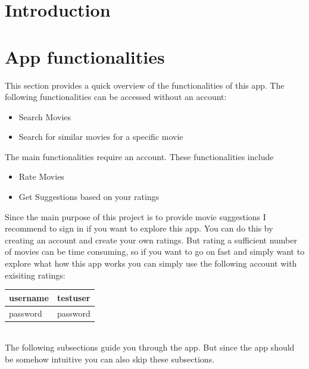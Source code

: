 \documentclass{article}
\begin{document}
\begin{abstract}
\end{abstract}

\tableofcontents

\newpage


\section{Introduction}






\section{App functionalities}

This section provides a quick overview of the functionalities of this app. The following functionalities can be accessed without an account:

\begin{itemize}
	\item Search Movies
	\item Search for similar movies for a specific movie
\end{itemize}
The main functionalities require an account. These functionalities include

\begin{itemize}
	\item Rate Movies
	\item Get Suggestions based on your ratings
\end{itemize}
Since the main purpose of this project is to provide movie suggestions I recommend to sign in if you want to explore this app. You can do this by creating an account and create your own ratings. But rating a sufficient number of movies can be time consuming, so if you want to go on fast and simply want to explore what how this app works you can simply use the following account with exisiting ratings:\\

\begin{tabular}{|l|l|}
\hline
username & testuser \\
\hline password & password\\
\hline
\end{tabular}\\

The following subsections guide you through the app. But since the app should be somehow intuitive you can also skip these subsections.
\end{document}
